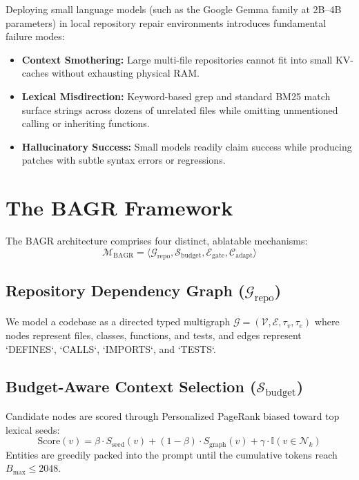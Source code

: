 \documentclass[10pt,twocolumn,letterpaper]{article}
\begin{document}
Deploying small language models (such as the Google Gemma family at 2B--4B parameters) in local repository repair environments introduces fundamental failure modes:
\begin{itemize}
    \item \textbf{Context Smothering:} Large multi-file repositories cannot fit into small KV-caches without exhausting physical RAM.
    \item \textbf{Lexical Misdirection:} Keyword-based grep and standard BM25 match surface strings across dozens of unrelated files while omitting unmentioned calling or inheriting functions.
    \item \textbf{Hallucinatory Success:} Small models readily claim success while producing patches with subtle syntax errors or regressions.
\end{itemize}

\section{The BAGR Framework}
The BAGR architecture comprises four distinct, ablatable mechanisms:
\begin{equation}
\mathcal{M}_{\text{BAGR}} = \langle \mathcal{G}_{\text{repo}}, \mathcal{S}_{\text{budget}}, \mathcal{E}_{\text{gate}}, \mathcal{C}_{\text{adapt}} \rangle
\end{equation}

\subsection{Repository Dependency Graph ($\mathcal{G}_{\text{repo}}$)}
We model a codebase as a directed typed multigraph $\mathcal{G} = (\mathcal{V}, \mathcal{E}, \tau_v, \tau_e)$ where nodes represent files, classes, functions, and tests, and edges represent `DEFINES`, `CALLS`, `IMPORTS`, and `TESTS`.

\subsection{Budget-Aware Context Selection ($\mathcal{S}_{\text{budget}}$)}
Candidate nodes are scored through Personalized PageRank biased toward top lexical seeds:
\begin{equation}
\text{Score}(v) = \beta \cdot S_{\text{seed}}(v) + (1 - \beta) \cdot S_{\text{graph}}(v) + \gamma \cdot \mathbb{I}(v \in \mathcal{N}_k)
\end{equation}
Entities are greedily packed into the prompt until the cumulative tokens reach $B_{\max} \le 2048$.
\end{document}
